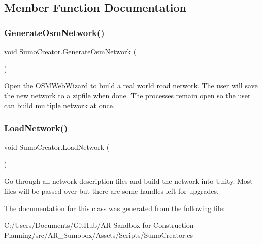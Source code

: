 \subsection{Member Function Documentation}
\mbox{\label{class_sumo_creator_aa1e8e70d55f358f0a1af525056627b50}} 
\subsubsection{\texorpdfstring{GenerateOsmNetwork()}{GenerateOsmNetwork()}}
{\footnotesize\ttfamily void Sumo\+Creator.\+Generate\+Osm\+Network (\begin{DoxyParamCaption}{ }\end{DoxyParamCaption})}



Open the O\+S\+M\+Web\+Wizard to build a real world road network. The user will save the new network to a zipfile when done. The processes remain open so the user can build multiple network at once. 

\mbox{\label{class_sumo_creator_a6fd91bdf15a05d7fc2b27b9e56a07042}} 
\subsubsection{\texorpdfstring{LoadNetwork()}{LoadNetwork()}}
{\footnotesize\ttfamily void Sumo\+Creator.\+Load\+Network (\begin{DoxyParamCaption}{ }\end{DoxyParamCaption})}



Go through all network description files and build the network into Unity. Most files will be passed over but there are some handles left for upgrades. 



The documentation for this class was generated from the following file\+:\begin{DoxyCompactItemize}
\item 
C\+:/\+Users/\+Documents/\+Git\+Hub/\+A\+R-\/\+Sandbox-\/for-\/\+Construction-\/\+Planning/src/\+A\+R\+\_\+\+Sumobox/\+Assets/\+Scripts/Sumo\+Creator.\+cs\end{DoxyCompactItemize}
